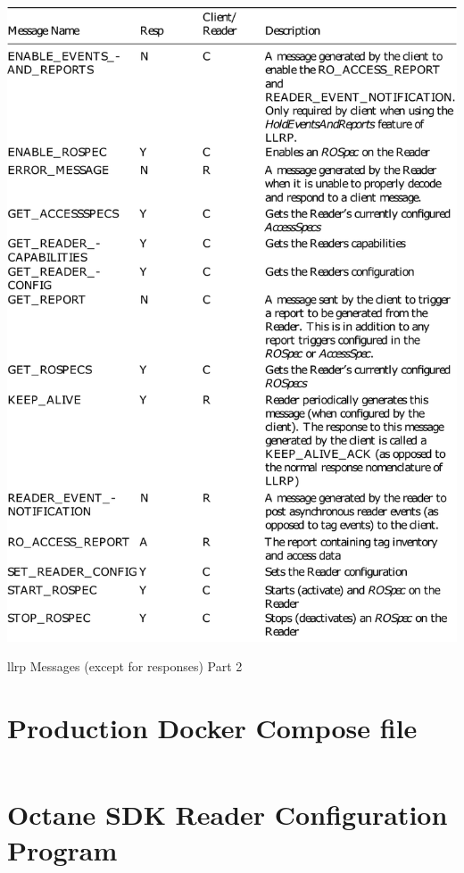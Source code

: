 \begin{appendices}
\begin{table}
    \centering
    \includegraphics[width=\textwidth]{./figs/02-state-of-the-art/table_llrpmessages_2.pdf}
    \caption[\ac{llrp} Messages (except for responses) Part 2]{\ac{llrp} Messages (except for responses) Part 2~\cite{ImpinjLTKProgrammers}} 
    \label{tab:llrpmessages2}
\end{table}

\clearpage

\section{Production Docker Compose file} \label{apx:composefile}
\inputminted[linenos, breaklines, frame=single]{yaml}{./code/docker-compose-production.yml}

\clearpage

\section{Octane SDK Reader Configuration Program} \label{apx:octanereaderconfig}
\inputminted[linenos, breaklines, frame=single]{java}{./code/App.java}


\end{appendices}
